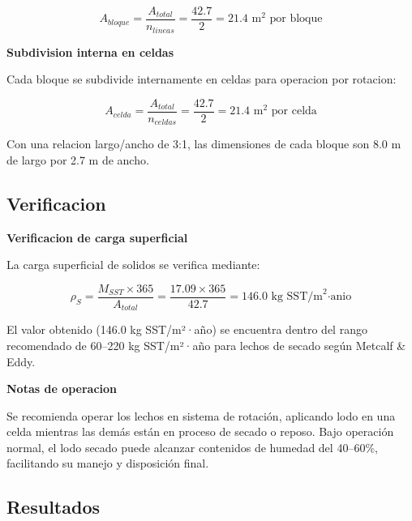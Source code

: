 \documentclass[12pt,a4paper]{article}
\begin{document}
\begin{equation}
A_{bloque} = \frac{A_{total}}{n_{lineas}} = \frac{42.7}{2} = 21.4 \text{ m}^2 \text{ por bloque}
\end{equation}

\textbf{Subdivision interna en celdas}

Cada bloque se subdivide internamente en celdas para operacion por rotacion:

\begin{equation}
A_{celda} = \frac{A_{total}}{n_{celdas}} = \frac{42.7}{2} = 21.4 \text{ m}^2 \text{ por celda}
\end{equation}

Con una relacion largo/ancho de 3:1, las dimensiones de cada bloque son 8.0 m de largo por 2.7 m de ancho.

\subsection{Verificacion}

\textbf{Verificacion de carga superficial}

La carga superficial de solidos se verifica mediante:

\begin{equation}
\rho_S = \frac{M_{SST} \times 365}{A_{total}} = \frac{17.09 \times 365}{42.7} = 146.0 \text{ kg SST/m}^2\text{·anio}
\end{equation}

El valor obtenido (146.0 kg SST/m²·año) se encuentra dentro del rango recomendado de 60--220 kg SST/m²·año para lechos de secado según Metcalf & Eddy.

\textbf{Notas de operacion}

Se recomienda operar los lechos en sistema de rotación, aplicando lodo en una celda mientras las demás están en proceso de secado o reposo. Bajo operación normal, el lodo secado puede alcanzar contenidos de humedad del 40--60\%, facilitando su manejo y disposición final.

\subsection{Resultados}
\end{document}
